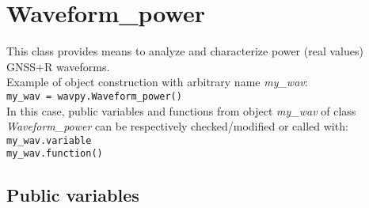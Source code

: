 \chapter{Waveform\_power}\label{cha:wav}

This class provides means to analyze and characterize power (real values) GNSS+R waveforms.\\

Example of object construction with arbitrary name {\it my\_wav}:\\

\texttt{my\_wav = wavpy.Waveform\_power()}\\

In this case, public variables and functions from object {\it my\_wav} of class {\it Waveform\_power} can be respectively checked/modified or called with:\\

\texttt{my\_wav.variable}\\

\texttt{my\_wav.function()}\\


\section{Public variables}

